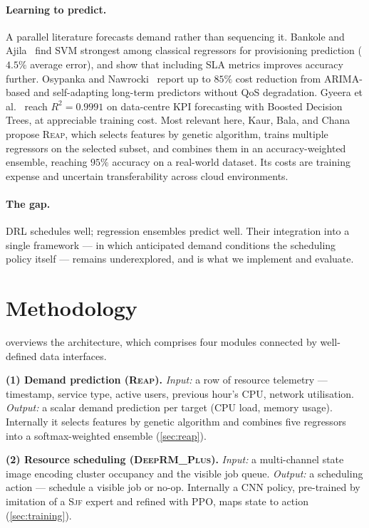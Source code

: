 \documentclass[runningheads]{llncs}
\newcommand{\reap}{\textsc{Reap}}
\newcommand{\deeprm}{\textsc{DeepRM\_Plus}}
\newcommand{\sjf}{\textsc{Sjf}}
\begin{document}
\paragraph{Learning to predict.} A parallel literature forecasts demand
rather than sequencing it. Bankole and Ajila~\cite{bankole2013} find
SVM strongest among classical regressors for provisioning prediction
($4.5\%$ average error), and show that including SLA metrics improves
accuracy further. Osypanka and Nawrocki~\cite{osypanka2022,osypanka2023}
report up to $85\%$ cost reduction from ARIMA-based and self-adapting
long-term predictors without QoS degradation. Gyeera
et al.~\cite{gyeera2023} reach $R^2=0.9991$ on data-centre KPI
forecasting with Boosted Decision Trees, at appreciable training cost.
Most relevant here, Kaur, Bala, and Chana~\cite{kaur2019} propose
\reap{}, which selects features by genetic algorithm, trains multiple
regressors on the selected subset, and combines them in an
accuracy-weighted ensemble, reaching $95\%$ accuracy on a real-world
dataset. Its costs are training expense and uncertain transferability
across cloud environments.

\paragraph{The gap.} DRL schedules well; regression ensembles predict
well. Their integration into a single framework --- in which
anticipated demand conditions the scheduling policy itself --- remains
underexplored, and is what we implement and evaluate.

\section{Methodology}\label{sec:methodology}
 overviews the architecture, which comprises four
modules connected by well-defined data interfaces.

\textbf{(1) Demand prediction (\reap{}).} \emph{Input:} a row of
resource telemetry --- timestamp, service type, active users, previous
hour's CPU, network utilisation. \emph{Output:} a scalar demand
prediction per target (CPU load, memory usage). Internally it selects
features by genetic algorithm and combines five regressors into a
softmax-weighted ensemble (\cref{sec:reap}).

\textbf{(2) Resource scheduling (\deeprm{}).} \emph{Input:} a
multi-channel state image encoding cluster occupancy and the visible
job queue. \emph{Output:} a scheduling action --- schedule a visible
job or no-op. Internally a CNN policy, pre-trained by imitation of a
\sjf{} expert and refined with PPO, maps state to action
(\cref{sec:training}).
\end{document}
